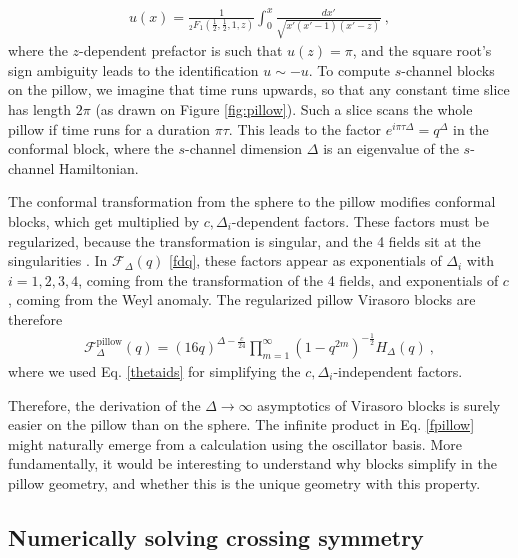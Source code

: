 \documentclass[12pt, a4paper]{article}
\begin{document}
\begin{align}
 u(x) = \frac{1}{{}_2F_1\left(\tfrac12,\tfrac12,1,z\right)} \int_0^x \frac{dx'}{\sqrt{x'(x'-1)(x'-z)}} \ ,
\end{align}
where the $z$-dependent prefactor is such that $u(z)=\pi$, and the square root's sign ambiguity leads to the identification $u\sim -u$. To compute $s$-channel blocks on the pillow, we imagine that time runs upwards, so that any constant time slice has length $2\pi$ (as drawn on Figure \eqref{fig:pillow}). Such a slice scans the whole pillow if time runs for a duration $\pi\tau$. This leads to the factor $e^{i\pi\tau\Delta}=q^\Delta$ in the conformal block, where the $s$-channel dimension $\Delta$ is an eigenvalue of the $s$-channel Hamiltonian. 

The conformal transformation from the sphere to the pillow modifies conformal blocks, which get multiplied by $c,\Delta_i$-dependent factors. These factors must be regularized, because the transformation is singular, and the 4 fields sit at the singularities \cite[Appendix D]{msz15}. In $\mathcal{F}_\Delta(q)$ \eqref{fdq}, these factors appear as exponentials of $\Delta_i$ with $i=1,2,3,4$, coming from the transformation of the 4 fields, and exponentials of $c$, coming from the Weyl anomaly. The regularized pillow Virasoro blocks are therefore
\begin{align}
 \mathcal{F}_\Delta^\text{pillow}(q) = (16q)^{\Delta-\frac{c}{24}} \prod_{m=1}^\infty \left(1-q^{2m}\right)^{-\frac12} H_\Delta(q)\ , 
 \label{fpillow} 
\end{align}
where we used Eq. \eqref{thetaids} for simplifying the $c,\Delta_i$-independent factors. 

Therefore, the derivation of the $\Delta\to\infty$ asymptotics of Virasoro blocks is surely easier on the pillow than on the sphere. The infinite product in Eq. \eqref{fpillow} might naturally emerge from a calculation using the oscillator basis. More fundamentally, it would be interesting to understand why blocks simplify in the pillow geometry, and whether this is the unique geometry with this property. 

\subsection{Numerically solving crossing symmetry}
\end{document}
